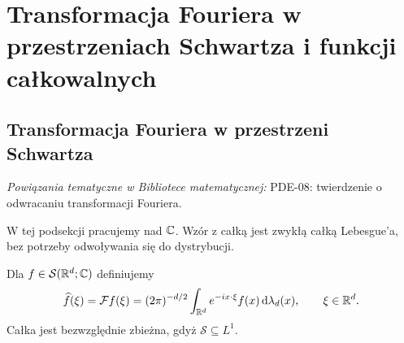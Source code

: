 \section{Transformacja Fouriera w przestrzeniach Schwartza i funkcji całkowalnych}
\providecommand{\atlasref}[2]{#2}

\subsection{Transformacja Fouriera w przestrzeni Schwartza}

\noindent\emph{Powiązania tematyczne w Bibliotece matematycznej:} \atlasref{PDE-08::thm:pde8-inversion}{PDE-08: twierdzenie o odwracaniu transformacji Fouriera}.


W tej podsekcji pracujemy nad $\mathbb C$. Wzór z całką jest zwykłą
całką Lebesgue'a, bez potrzeby odwoływania się do dystrybucji.

\begin{definicja}
\label{def:fourier-schwartz17}
Dla $f\in\mathcal S(\mathbb R^d;\mathbb C)$ definiujemy
\[
\widehat f(\xi)=\mathcal Ff(\xi)=
(2\pi)^{-d/2}\int_{\mathbb R^d}e^{-ix\cdot\xi}f(x)\,
\mathrm d\lambda_d(x),\qquad\xi\in\mathbb R^d.
\]
Całka jest bezwzględnie zbieżna, gdyż $\mathcal S\subseteq L^1$.
\end{definicja}

